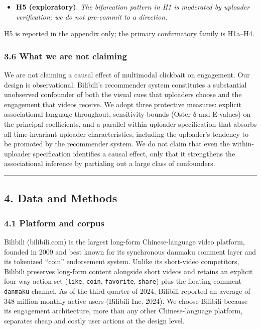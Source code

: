 \documentclass[
  12pt,
]{article}
\providecommand{\tightlist}{%
  \setlength{\itemsep}{0pt}\setlength{\parskip}{0pt}}
\begin{document}
\begin{itemize}
\tightlist
\item
  \textbf{H5 (exploratory)}. \emph{The bifurcation pattern in H1 is
  moderated by uploader verification; we do not pre-commit to a
  direction.}
\end{itemize}

H5 is reported in the appendix only; the primary confirmatory family is
H1a--H4.

\subsubsection{3.6 What we are not
claiming}\label{what-we-are-not-claiming}

We are not claiming a causal effect of multimodal clickbait on
engagement. Our design is observational. Bilibili's recommender system
constitutes a substantial unobserved confounder of both the visual cues
that uploaders choose and the engagement that videos receive. We adopt
three protective measures: explicit associational language throughout,
sensitivity bounds (Oster δ and E-values) on the principal coefficients,
and a parallel within-uploader specification that absorbs all
time-invariant uploader characteristics, including the uploader's
tendency to be promoted by the recommender system. We do not claim that
even the within-uploader specification identifies a causal effect, only
that it strengthens the associational inference by partialing out a
large class of confounders.

\begin{center}\rule{0.5\linewidth}{0.5pt}\end{center}

\subsection{4. Data and Methods}\label{data-and-methods}

\subsubsection{4.1 Platform and corpus}\label{platform-and-corpus}

Bilibili (bilibili.com) is the largest long-form Chinese-language video
platform, founded in 2009 and best known for its synchronous danmaku
comment layer and its tokenized ``coin'' endorsement system. Unlike its
short-video competitors, Bilibili preserves long-form content alongside
short videos and retains an explicit four-way action set (\texttt{like},
\texttt{coin}, \texttt{favorite}, \texttt{share}) plus the
floating-comment \texttt{danmaku} channel. As of the third quarter of
2024, Bilibili reported an average of 348 million monthly active users
(Bilibili Inc. 2024). We choose Bilibili because its engagement
architecture, more than any other Chinese-language platform, separates
cheap and costly user actions at the design level.
\end{document}
